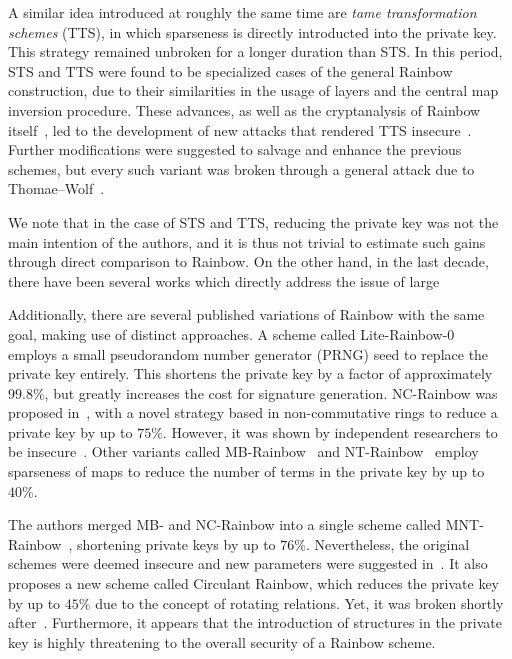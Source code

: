 \documentclass[draft, 12pt, a4paper, oneside]{memoir}
\begin{document}
A similar idea introduced at roughly the same time are \emph{tame transformation schemes} (TTS), in which sparseness is directly introducted into the private key. This strategy remained unbroken for a longer duration than STS. In this period, STS and TTS were found to be specialized cases of the general Rainbow construction, due to their similarities in the usage of layers and the central map inversion procedure. These advances, as well as the cryptanalysis of Rainbow itself~\cite{}, led to the development of new attacks that rendered TTS insecure~\cite{}. Further modifications were suggested to salvage and enhance the previous schemes, but every such variant was broken through a general attack due to Thomae--Wolf~\cite{}.

We note that in the case of STS and TTS, reducing the private key was not the main intention of the authors, and it is thus not trivial to estimate such gains through direct comparison to Rainbow. On the other hand, in the last decade, there have been several works which directly address the issue of large

Additionally, there are several published variations of Rainbow with the
same goal, making use of distinct approaches. A scheme called
Lite-Rainbow-0~\cite{Shim:201512:inproc} employs a small pseudorandom
number generator (PRNG) seed to replace the private key entirely. This shortens
the private key by a factor of approximately $99.8\%$, but greatly increases
the cost for signature generation. NC-Rainbow was proposed
in~\cite{Yasuda:201202:inproc}, with a novel strategy based in non-commutative
rings to reduce a private key by up to $75\%$. However, it was shown by
independent researchers to be
insecure~\cite{Thomae:201209:inproc,Hashimoto:201302:inproc}. Other variants
called MB-Rainbow~\cite{Yasuda:201305:inproc} and
NT-Rainbow~\cite{Yasuda:201404:inproc} employ sparseness of maps to reduce the
number of terms in the private key by up to $40\%$.

The authors merged MB- and NC-Rainbow into a single scheme called
MNT-Rainbow~\cite{Yasuda:201409:article}, shortening private keys by up to
$76\%$. Nevertheless, the original schemes were deemed insecure and new
parameters were suggested in~\cite{Peng:201706:article}. It also proposes a new
scheme called Circulant Rainbow, which reduces the private key by up to $45\%$
due to the concept of rotating relations. Yet, it was broken shortly
after~\cite{Hashimoto:201810:misc}. Furthermore, it appears that the introduction
of structures in the private key is highly threatening to the overall security 
of a Rainbow scheme.
\end{document}
